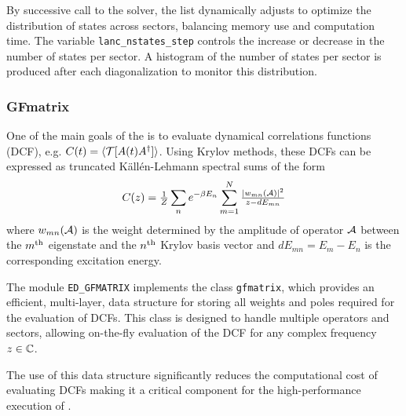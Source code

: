\documentclass[edipack_sp.tex]{subfiles}
\begin{document}
By successive call to the \NAME solver, the list dynamically adjusts to optimize the distribution of states 
across sectors, balancing memory use and computation time. The
variable \texttt{lanc\_nstates\_step} controls the increase or
decrease in the number of states per sector. 
A histogram  of the number of states per sector is produced after each diagonalization to monitor this distribution.



\subsubsection{GFmatrix}
One of the main goals of the \NAME is to evaluate dynamical correlations
functions (DCF), e.g. $C(t) = \ibra \TT[ A(t) A^\dagger ]\iket$. Using Krylov methods,
these DCFs can be expressed as truncated K\"all\'en-Lehmann spectral sums of the form
$$
C(z) = \tfrac{1}{Z}\sum_n e^{-\beta E_n} \sum_{m=1}^{N} \tfrac{|w_{mn}(\AA)|^2}{ z
  - dE_{mn}}
$$
where $w_{mn}(\AA)$ is the weight determined by the amplitude of operator $\AA$ between the
$m^{\rm th}$ eigenstate and the $n^{\rm th}$ Krylov basis vector and
$dE_{mn}=E_m-E_n$ is the corresponding excitation energy.

The module {\tt ED\_GFMATRIX} implements the class {\tt gfmatrix}, 
which provides an efficient, multi-layer, data structure for storing 
all weights and poles required for the evaluation of DCFs. This 
class is designed to handle multiple operators and sectors, allowing 
on-the-fly evaluation of the DCF for any complex frequency 
$z\in\CCC$.

The use of this data structure significantly reduces the computational 
cost of evaluating DCFs making it a critical component 
for the high-performance execution of \NAME.
\end{document}
